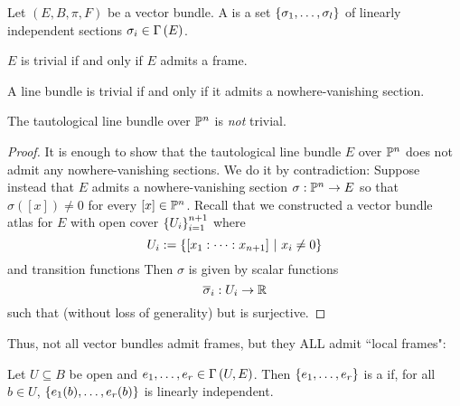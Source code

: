 \documentclass[main.tex]{subfiles}
\begin{document}
Let $(E, B, \pi, F)$ be a vector bundle. A  is a set $\left\{\sigma_1, \dots, \sigma_l\right\}$ of linearly independent sections $\sigma_i \in \Gamma\left( E \right)$.

\begin{prop}
$E$ is trivial if and only if $E$ admits a frame.
\end{prop}

\begin{cor}
A line bundle is trivial if and only  if it admits a nowhere-vanishing section.
\end{cor}

\begin{prop}
The tautological line bundle over $\mathbb{P}^n$ is \textit{not} trivial.
\end{prop}

\begin{proof}
    It is enough to show that the tautological line bundle $E$ over $\mathbb{P}^n$ does not admit any nowhere-vanishing sections. We do it by contradiction: Suppose instead that $E$ admits a nowhere-vanishing section $\sigma: \mathbb{P}^n \to E$ so that $\sigma([x]) \neq 0$ for every $[x] \in \mathbb{P}^n$. Recall that we constructed a vector bundle atlas for $E$ with open cover $\left\{U_i\right\}_{i=1}^{n+1}$ where 
    \[
    U_i := \left\{ [x_1 : \dots : x_{n+1}] \ | \  x_i \neq 0 \right\}
    \]
    and transition functions 
    Then $\sigma$ is given by scalar functions
    \[
    \overline{\sigma}_i : U_i \to \mathbb{R}
    \]
    such that (without loss of generality)
    but 
     is surjective.
\end{proof}

Thus, not all vector bundles admit frames, but they ALL admit ``local frames": 

\begin{defn}
 Let $U \subseteq B$ be open and $e_1, \dots, e_r \in \Gamma\left( U, E \right)$. Then $\left\{e_1, \dots, e_r\right\}$ is a  if, for all $b \in U$, $\left\{ e_1(b), \dots, e_r(b)\right\}$ is linearly independent.
\end{defn}
\end{document}

